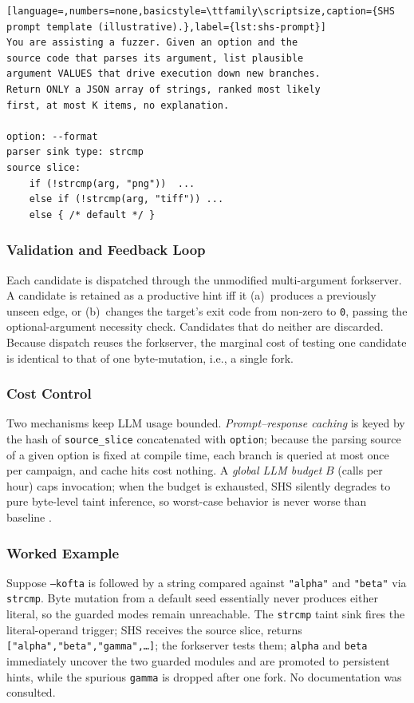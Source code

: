 \begin{lstlisting}[language=,numbers=none,basicstyle=\ttfamily\scriptsize,caption={SHS prompt template (illustrative).},label={lst:shs-prompt}]
You are assisting a fuzzer. Given an option and the
source code that parses its argument, list plausible
argument VALUES that drive execution down new branches.
Return ONLY a JSON array of strings, ranked most likely
first, at most K items, no explanation.

option: --format
parser sink type: strcmp
source slice:
    if (!strcmp(arg, "png"))  ...
    else if (!strcmp(arg, "tiff")) ...
    else { /* default */ }
\end{lstlisting}

\subsubsection{Validation and Feedback Loop}
Each candidate is dispatched through the unmodified multi-argument forkserver. A candidate is retained as a productive hint iff it (a)~produces a previously unseen edge, or (b)~changes the target's exit code from non-zero to \texttt{0}, passing the optional-argument necessity check. Candidates that do neither are discarded. Because dispatch reuses the forkserver, the marginal cost of testing one candidate is identical to that of one byte-mutation, i.e., a single fork.

\subsubsection{Cost Control}
Two mechanisms keep LLM usage bounded. \emph{Prompt--response caching} is keyed by the hash of \texttt{source\_slice} concatenated with \texttt{option}; because the parsing source of a given option is fixed at compile time, each branch is queried at most once per campaign, and cache hits cost nothing. A \emph{global LLM budget} $B$ (calls per hour) caps invocation; when the budget is exhausted, SHS silently degrades to pure byte-level taint inference, so worst-case behavior is never worse than baseline \KOFTA{}.

\subsubsection{Worked Example}
Suppose \texttt{--kofta} is followed by a string compared against \texttt{"alpha"} and \texttt{"beta"} via \texttt{strcmp}. Byte mutation from a default seed essentially never produces either literal, so the guarded modes remain unreachable. The \texttt{strcmp} taint sink fires the literal-operand trigger; SHS receives the source slice, returns \texttt{["alpha","beta","gamma",\dots]}; the forkserver tests them; \texttt{alpha} and \texttt{beta} immediately uncover the two guarded modules and are promoted to persistent hints, while the spurious \texttt{gamma} is dropped after one fork. No documentation was consulted.

